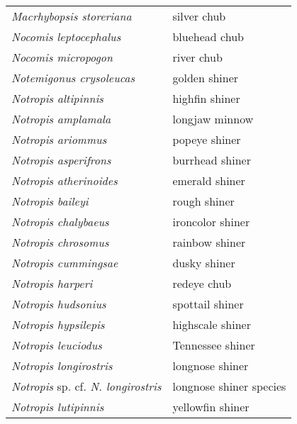 \documentclass[11pt]{article}
\begin{document}
\vspace{\baselineskip}

%
\textbf{\Student}

\begin{tabular}{@{}L{3in}L{3in}@{}}
\textit{Macrhybopsis storeriana} &   silver chub\tabularnewline
\textit{Nocomis leptocephalus} &   bluehead chub\tabularnewline
\textit{Nocomis micropogon} &   river chub\tabularnewline
\textit{Notemigonus crysoleucas} &   golden shiner\tabularnewline
\textit{Notropis altipinnis} &   highfin shiner\tabularnewline
\textit{Notropis amplamala} &   longjaw minnow\tabularnewline
\textit{Notropis ariommus} &   popeye shiner\tabularnewline
\textit{Notropis asperifrons} &   burrhead shiner\tabularnewline
\textit{Notropis atherinoides} &   emerald shiner\tabularnewline
\textit{Notropis baileyi} &   rough shiner\tabularnewline
\textit{Notropis chalybaeus} &   ironcolor shiner\tabularnewline
\textit{Notropis chrosomus} &   rainbow shiner\tabularnewline
\textit{Notropis cummingsae} &   dusky shiner\tabularnewline
\textit{Notropis harperi} &   redeye chub\tabularnewline
\textit{Notropis hudsonius} &   spottail shiner\tabularnewline
\textit{Notropis hypsilepis} &   highscale shiner\tabularnewline
\textit{Notropis leuciodus} &   Tennessee shiner\tabularnewline
\textit{Notropis longirostris} &   longnose shiner\tabularnewline
\textit{Notropis} sp. cf. \textit{N. longirostris} &   longnose shiner species\tabularnewline
\textit{Notropis lutipinnis} &   yellowfin shiner\tabularnewline
\end{tabular}

\newpage

\vspace{\baselineskip}

%
\textbf{\Student}
\end{document}
